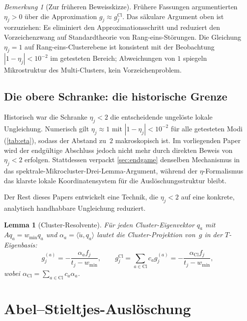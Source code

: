 \documentclass[12pt,a4paper]{article}
\newtheorem{lemma}[theorem]{Lemma}
\theoremstyle{definition}
\theoremstyle{remark}
\newtheorem{remark}[theorem]{Bemerkung}
\newcommand{\Cl}{\mathrm{Cl}}
\newcommand{\ip}[2]{\langle #1, #2 \rangle}
\newcommand{\utilde}{\tilde{u}}
\newcommand{\wmin}{w_{\min}}
\begin{document}
\begin{remark}[Zur früheren Beweisskizze]
\label{rem:eta-positive-history}
Frühere Fassungen argumentierten $\eta_j>0$ über die Approximation
$g_j \approx g_j^{\Cl}$. Das säkulare Argument oben ist vorzuziehen: Es
eliminiert den Approximationsschritt und reduziert den Vorzeichenzwang auf
Standardtheorie von Rang-eins-Störungen. Die Gleichung $\eta_j=1$ auf
Rang-eins-Clusterebene ist konsistent mit der Beobachtung
$|1-\eta_j|<10^{-2}$ im getesteten Bereich; Abweichungen von $1$ spiegeln
Mikrostruktur des Multi-Clusters, kein Vorzeichenproblem.
\end{remark}

\subsection{Die obere Schranke: die historische Grenze}

Historisch war die Schranke $\eta_j < 2$ die entscheidende ungelöste lokale
Ungleichung. Numerisch gilt $\eta_j \approx 1$ mit $|1-\eta_j|<10^{-2}$
für alle getesteten Modi (\cref{tab:eta}), sodass der Abstand zu~$2$ makroskopisch ist.
Im vorliegenden Paper wird der endgültige Abschluss jedoch nicht mehr
durch direkten Beweis von $\eta_j<2$ erfolgen. Stattdessen verpackt \cref{sec:endgame}
denselben Mechanismus in das spektrale-Mikrocluster-Drei-Lemma-Argument,
während der $\eta$-Formalismus das klarste lokale Koordinatensystem
für die Auslöschungsstruktur bleibt.

Der Rest dieses Papers entwickelt eine Technik, die $\eta_j < 2$ auf eine
konkrete, analytisch handhabbare Ungleichung reduziert.

\begin{lemma}[Cluster-Resolvente]
\label{lem:cluster-resolvent}
Für jeden Cluster-Eigenvektor $q_a$ mit $A q_a = \wmin q_a$
und $\alpha_a = \ip{\utilde}{q_a}$ lautet die Cluster-Projektion von~$g$
in der $T$-Eigenbasis:
\begin{equation}
g_j^{(a)} = -\frac{\alpha_a f_j}{t_j - \wmin},
\qquad
g_j^{\Cl} = \sum_{a \in \Cl} c_a g_j^{(a)}
= -\frac{\alpha_{\Cl} f_j}{t_j - \wmin},
\end{equation}
wobei $\alpha_{\Cl} = \sum_{a \in \Cl} c_a \alpha_a$.
\end{lemma}

\section{Abel--Stieltjes-Auslöschung}
\label{sec:abel}
\end{document}
